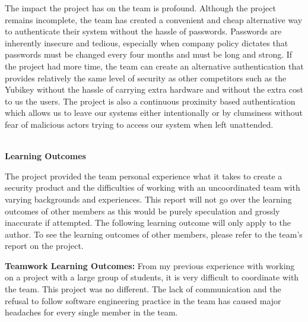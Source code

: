 \documentclass[letterpaper,twocolumn,10pt]{article}
\begin{document}
{{The impact the project has on the team is profound. Although the project remains incomplete, the team has created a convenient and cheap alternative way to authenticate their system without the hassle of passwords. Passwords are inherently insecure and tedious, especially when company policy dictates that passwords must be changed every four months and must be long and strong. If the project had more time, the team can create an alternative authentication that provides relatively the same level of security as other competitors such as the Yubikey without the hassle of carrying extra hardware and without the extra cost to us the users. The project is also a continuous proximity based authentication which allows us to leave our systems either intentionally or by clumsiness without fear of malicious actors trying to access our system when left unattended. 

\hrulefill\\
\large \textbf{Learning Outcomes}

\normalsize
The project provided the team personal experience what it takes to create a security product and the difficulties of working with an uncoordinated team with varying backgrounds and experiences. This report will not go over the learning outcomes of other members as this would be purely speculation and grossly inaccurate if attempted. The following learning outcome will only apply to the author. To see the learning outcomes of other members, please refer to the team's report on the project.

\noindent\textbf{Teamwork Learning Outcomes:} From my previous experience with working on a project with a large group of students, it is very difficult to coordinate with the team. This project was no different. The lack of communication and the refusal to follow software engineering practice in the team has caused major headaches for every single member in the team.\\

}}
\end{document}
